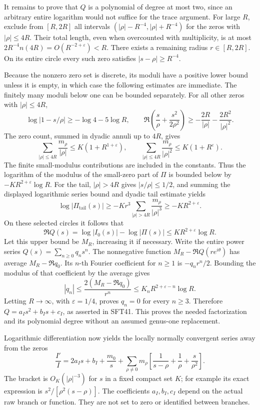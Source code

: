 \documentclass[
  10pt,
  a4paper,
]{article}
\begin{document}
It remains to prove that \(Q\) is a polynomial of degree at most two,
since an arbitrary entire logarithm would not suffice for the trace
argument. For large \(R\), exclude from \([R,2R]\) all intervals
\((|\rho|-R^{-4},|\rho|+R^{-4})\) for the zeros with \(|\rho|\le4R\).
Their total length, even when overcounted with multiplicity, is at most
\(2R^{-4}n(4R)=O(R^{-2+\varepsilon})<R\). There exists a remaining
radius \(r\in[R,2R]\). On its entire circle every such zero satisfies
\(|s-\rho|\ge R^{-4}\).

Because the nonzero zero set is discrete, its moduli have a positive
lower bound unless it is empty, in which case the following estimates
are immediate. The finitely many moduli below one can be bounded
separately. For all other zeros with \(|\rho|\le4R\), \[
 \log|1-s/\rho|\ge-\log4-5\log R,
 \qquad
 \Re\left(\frac{s}{\rho}+\frac{s^2}{2\rho^2}\right)
      \ge-\frac{2R}{|\rho|}-\frac{2R^2}{|\rho|^2}.
\] The zero count, summed in dyadic annuli up to \(4R\), gives \[
 \sum_{|\rho|\le4R}\frac{m_\rho}{|\rho|}
       \le K(1+R^{1+\varepsilon}),\qquad
 \sum_{|\rho|\le4R}\frac{m_\rho}{|\rho|^2}
       \le K(1+R^\varepsilon).
\] The finite small-modulus contributions are included in the constants.
Thus the logarithm of the modulus of the small-zero part of \(\Pi\) is
bounded below by \(-K R^{2+\varepsilon}\log R\). For the tail,
\(|\rho|>4R\) gives \(|s/\rho|\le1/2\), and summing the displayed
logarithmic series bound and dyadic tail estimate yields \[
 \log|\Pi_{\mathrm{tail}}(s)|
       \ge-K r^3\sum_{|\rho|>4R}
                           \frac{m_\rho}{|\rho|^3}
       \ge-KR^{2+\varepsilon}.
\] On these selected circles it follows that \[
 \Re Q(s)=\log|I_0(s)|-\log|\Pi(s)|
          \le K R^{2+\varepsilon}\log R.
\] Let this upper bound be \(M_R\), increasing it if necessary. Write
the entire power series \(Q(s)=\sum_{n\ge0}q_ns^n\). The nonnegative
function \(M_R-\Re Q(r e^{i\theta})\) has average \(M_R-\Re q_0\). Its
\(n\)-th Fourier coefficient for \(n\ge1\) is \(-q_n r^n/2\). Bounding
the modulus of that coefficient by the average gives \[
 |q_n|\le\frac{2(M_R-\Re q_0)}{r^n}
            \le K_n R^{2+\varepsilon-n}\log R.
\] Letting \(R\to\infty\), with \(\varepsilon=1/4\), proves \(q_n=0\)
for every \(n\ge3\). Therefore \(Q=a_Is^2+b_Is+c_I\), as asserted in
SFT41. This proves the needed factorization and its polynomial degree
without an assumed genus-one replacement.

Logarithmic differentiation now yields the locally normally convergent
series away from the zeros \[
 \frac{I'}I=
       2a_I s+b_I+\frac{m_0}{s}
       +\sum_{\rho\ne0}m_\rho
          \left[\frac1{s-\rho}+\frac1\rho+\frac{s}{\rho^2}\right].
 \tag{SFT42}
\] The bracket is \(O_K(|\rho|^{-3})\) for \(s\) in a fixed compact set
\(K\); for example its exact expression is \(s^2/[\rho^2(s-\rho)]\). The
coefficients \(a_I,b_I,c_I\) depend on the actual raw branch or
function. They are not set to zero or identified between branches.
\end{document}
